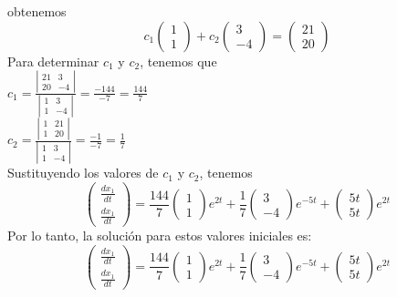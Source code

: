 obtenemos
$$c_1 \begin{pmatrix}
1\\
1
\end{pmatrix} + c_2 \begin{pmatrix}
3\\
-4
\end{pmatrix} = \begin{pmatrix}
21\\
20
\end{pmatrix}$$
Para determinar $c_1$ y $c_2$, tenemos que
\\
$c_1 = \frac{\left|\begin{matrix}
21 & 3\\
20 & -4
\end{matrix} \right|}{\left|\begin{matrix}
1 & 3\\
1 & -4
\end{matrix} \right|} = \frac{-144}{-7} = \frac{144}{7}$\\
$c_2 = \frac{\left|\begin{matrix}
1 & 21\\
1 & 20
\end{matrix} \right|}{\left|\begin{matrix}
1 & 3\\
1 & -4
\end{matrix} \right|} = \frac{-1}{-7} = \frac{1}{7}$\\
Sustituyendo los valores de $c_1$ y $c_2$, tenemos
$$\begin{pmatrix}
\frac{dx_1}{dt}\\
\frac{dx_1}{dt}
\end{pmatrix} = \frac{144}{7} \begin{pmatrix}
     1\\
     1
     \end{pmatrix}e^{2t} + \frac{1}{7} \begin{pmatrix}
     3\\
     -4
     \end{pmatrix}e^{-5t} + \begin{pmatrix}
     5t\\
     5t
     \end{pmatrix}e^{2t}$$
Por lo tanto, la solución para estos valores iniciales es:
$$\begin{pmatrix}
\frac{dx_1}{dt}\\
\frac{dx_1}{dt}
\end{pmatrix} = \frac{144}{7} \begin{pmatrix}
     1\\
     1
     \end{pmatrix}e^{2t} + \frac{1}{7} \begin{pmatrix}
     3\\
     -4
     \end{pmatrix}e^{-5t} + \begin{pmatrix}
     5t\\
     5t
     \end{pmatrix}e^{2t}$$
